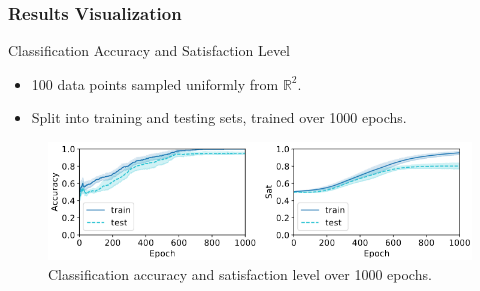 \documentclass{beamer}
\begin{document}
\begin{frame}
\frametitle{Results Visualization}
\begin{block}{Classification Accuracy and Satisfaction Level}
\begin{itemize}
    \item 100 data points sampled uniformly from \( \mathbb{R}^2 \).
    \item Split into training and testing sets, trained over 1000 epochs.
\end{itemize}
\end{block}

\begin{figure}
\includegraphics[width=\textwidth]{ltn1000.png}
\caption{Classification accuracy and satisfaction level over 1000 epochs.}
\end{figure}
\end{frame}
\end{document}
